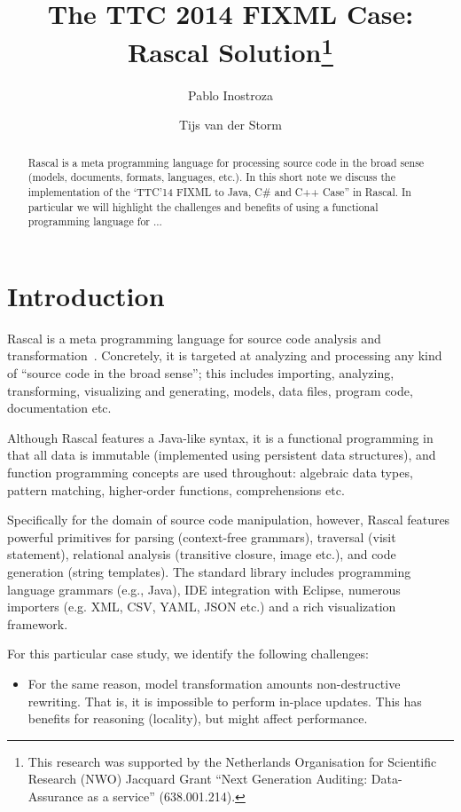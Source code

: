 \documentclass[submission,copyright,creativecommons]{eptcs}
\title{The TTC 2014 FIXML Case: Rascal Solution\thanks{This
    research was supported by the Netherlands Organisation for
    Scientific Research (NWO) Jacquard Grant ``Next Generation
    Auditing: Data-Assurance as a service'' (638.001.214).}}
\author{Pablo Inostroza \and Tijs van der Storm}
\begin{document}
\maketitle

\begin{abstract}
Rascal is a meta programming language for processing source code in the broad sense (models, documents, formats, languages, etc.). In this short note we discuss the implementation of the `TTC'14 FIXML to Java, C\# and C++ Case'' in Rascal. In particular we will highlight the challenges and benefits of using a functional programming language for ...
\end{abstract}

\section{Introduction}

Rascal is a meta programming language for source code analysis and transformation~\cite{Rascal,RascalGTTSE}. 
Concretely, it is targeted at analyzing and processing any kind of ``source code in the broad sense''; this includes importing, analyzing, transforming, visualizing and generating, models, data files, program code, documentation etc.
 
Although Rascal features a Java-like syntax, it is a functional programming in that all data is immutable (implemented using persistent data structures), and function programming concepts are used throughout: algebraic data types, pattern matching, higher-order functions, comprehensions etc. 

Specifically for the domain of source code manipulation, however, Rascal features powerful primitives for parsing (context-free grammars), traversal (visit statement), relational analysis (transitive closure, image etc.), and code generation (string templates). 
The standard library includes programming language grammars (e.g., Java), IDE integration
with Eclipse, numerous importers (e.g. XML, CSV, YAML, JSON etc.) and a rich visualization framework. 

For this particular case study, we identify the following challenges:
\begin{itemize}
\item For the same reason, model transformation amounts  non-destructive rewriting. That is, it is impossible to perform in-place updates. This has benefits for reasoning (locality), but might affect performance.
\end{itemize}
\end{document}
